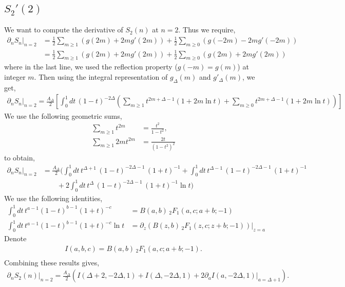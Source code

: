 \documentclass[11pt]{article}
\newcommand{\p}{\partial}
\newcommand{\nn}{\nonumber}
\newcommand{\lb}{\left(}
\newcommand{\rb}{\right)}
\begin{document}
\subsection{\texorpdfstring{$S_2'(2)$}{ S2'(2)}}\label{Analytic continuation of S2' at n =2}
We want to compute the derivative of $S_2(n)$ at $n=2$. Thus we require,
\begin{align}
    \p_n S_n |_{n=2} &= \frac{1}{2}\sum_{m\geq 1} \lb g(2m) + 2m g'(2m) \rb + \frac{1}{2}\sum_{m\geq 0} \lb g(-2m) -2m g'(-2m) \rb \\
    &= \frac{1}{2}\sum_{m\geq 1} \lb g(2m) + 2m g'(2m) \rb + \frac{1}{2}\sum_{m\geq 0} \lb g(2m) +2m g'(2m) \rb
\end{align}
where in the last line, we used the reflection property ($g(-m) = g(m)$) at integer $m$. Then using the integral representation of $g_{\Delta}(m)$ and $g'_\Delta (m)$, we get,
\begin{align}
    \p_n S_n |_{n=2} = \frac{A_\Delta}{2}\left[ \int_0^1 dt \, (1-t)^{-2\Delta} \lb \sum_{m\geq 1}t^{2m+\Delta - 1}(1+2m \ln t) + \sum_{m\geq 0} t^{2m+\Delta - 1}(1+2m \ln t)\rb\right]
\end{align}
We use the following geometric sums,
\begin{align}
    \sum_{m\geq 1} t^{2m} &= \frac{t^2}{1-t^2},\\
    \sum_{m\geq 1} 2mt^{2m}&= \frac{2t}{(1-t^2)^2}
\end{align}
to obtain,
\begin{align}
    \p_n S_n |_{n=2} &= \frac{A_\Delta}{2}\Big( \int_0^1 dt \, t^{\Delta +1}\, (1-t)^{-2\Delta - 1}\, (1+t)^{-1} + \int_0^1 dt \, t^{\Delta -1}\, (1-t)^{-2\Delta - 1}\, (1+t)^{-1} \nn \\
    & \qquad +2\int_0^1 dt \, t^{\Delta }\, (1-t)^{-2\Delta - 1}\, (1+t)^{-1}\ln t \Big)
\end{align}
We use the following identities,
\begin{align}
    \int_0^1 dt \, t^{a-1} (1-t)^{b-1} (1+t)^{-c} &= B(a,b)\, _2F_1(a,c;a+b;-1)\\
    \int_0^1 dt \, t^{a-1} (1-t)^{b-1} (1+t)^{-c} \ln t &= \p_z \lb B(z,b)\, _2F_1(z,c;z+b;-1) \rb|_{z=a}
\end{align}
Denote 
\begin{align}
    I(a,b,c) = B(a,b) \, _2F_1(a,c;a+b;-1). \\
\end{align}
Combining these results gives,
\begin{align}
    \p_nS_2(n)|_{n=2} = \frac{A_\Delta}{2}\lb I(\Delta + 2,-2\Delta,1) + I(\Delta,-2\Delta,1) +2\p_aI(a,-2\Delta,1)|_{a = \Delta +1}\rb.
\end{align}
\end{document}
